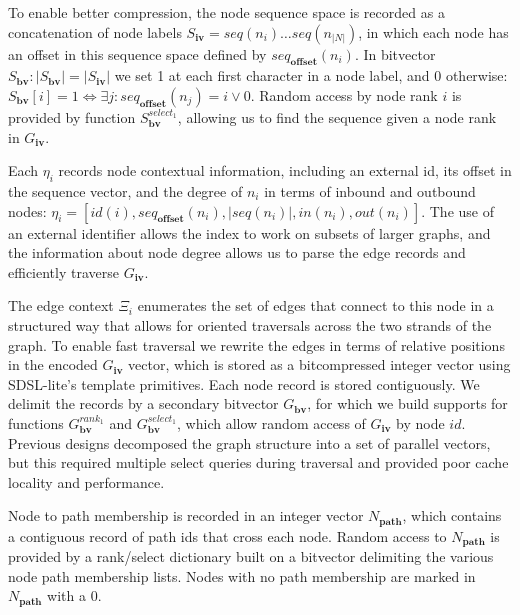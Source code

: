 \documentclass[a4paper,12pt,numbered,oneside]{Classes/PhDThesisPSnPDF}
\begin{document}
To enable better compression, the node sequence space is recorded as a concatenation of node labels $S_\textbf{iv} = seq(n_i) \ldots seq(n_{|N|})$, in which each node has an offset in this sequence space defined by $seq_\textbf{offset}(n_i)$.
In bitvector $S_\textbf{bv} : |S_\textbf{bv}| = |S_\textbf{iv}|$ we set 1 at each first character in a node label, and 0 otherwise: $S_\textbf{bv}[i] = 1 \iff \exists j : seq_\textbf{offset}(n_j) = i \lor 0$.
Random access by node rank $i$ is provided by function $S_\textbf{bv}^{select_1}$, allowing us to find the sequence given a node rank in $G_\textbf{iv}$.

Each $\eta_i$ records node contextual information, including an external id, its offset in the sequence vector, and the degree of $n_i$ in terms of inbound and outbound nodes: $\eta_i = \left[ id(i), seq_\textbf{offset}(n_i), |seq(n_i)|, in(n_i), out(n_i) \right]$.
The use of an external identifier allows the index to work on subsets of larger graphs, and the information about node degree allows us to parse the edge records and efficiently traverse $G_\textbf{iv}$.

The edge context $\Xi_i$ enumerates the set of edges that connect to this node in a structured way that allows for oriented traversals across the two strands of the graph.
To enable fast traversal we rewrite the edges in terms of relative positions in the encoded $G_\textbf{iv}$ vector, which is stored as a bitcompressed integer vector using SDSL-lite's template primitives.
Each node record is stored contiguously.
We delimit the records by a secondary bitvector $G_\textbf{bv}$, for which we build supports for functions $G_\textbf{bv}^{rank_1}$ and $G_\textbf{bv}^{select_1}$, which allow random access of $G_\textbf{iv}$ by node $id$.
Previous designs decomposed the graph structure into a set of parallel vectors, but this required multiple select queries during traversal and provided poor cache locality and performance.

Node to path membership is recorded in an integer vector $N_\textbf{path}$, which contains a contiguous record of path ids that cross each node.
Random access to $N_\textbf{path}$ is provided by a rank/select dictionary built on a bitvector delimiting the various node path membership lists.
Nodes with no path membership are marked in $N_\textbf{path}$ with a 0.
\end{document}
